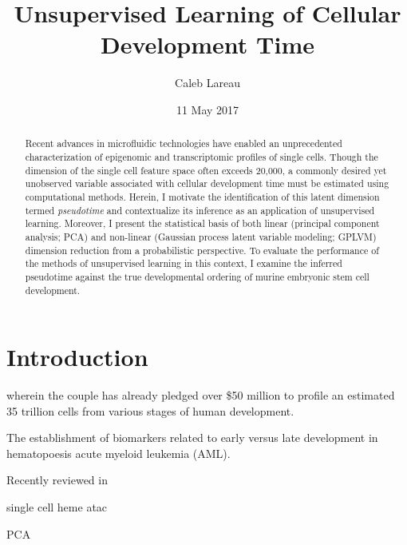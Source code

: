\documentclass[english, 11pt]{article}\usepackage[]{graphicx}\usepackage[]{color}
\begin{document}
\title{Unsupervised Learning of Cellular Development Time}


\author{Caleb Lareau}


\date{11 May 2017}
\maketitle
\begin{abstract}
\noindent Recent advances in microfluidic technologies have enabled an unprecedented characterization of epigenomic and transcriptomic profiles of single cells. Though the dimension of the single cell feature space often exceeds 20,000, a commonly desired yet unobserved variable associated with cellular development time must be estimated using computational methods. Herein, I motivate the identification of this latent dimension termed \textit{pseudotime} and contextualize its inference as an application of unsupervised learning. Moreover, I present the statistical basis of both linear (principal component analysis; PCA) and non-linear (Gaussian process latent variable modeling; GPLVM) dimension reduction from a probabilistic perspective. To evaluate the performance of the methods of unsupervised learning in this context, I examine the inferred pseudotime against the true developmental ordering of murine embryonic stem cell development. 

\newpage{}
\end{abstract}





\section{Introduction}
wherein the couple has already pledged over \$50 million to profile an estimated 35 trillion cells from various stages of human development. \cite{HCA}

The establishment of biomarkers related to early versus late development in hematopoesis acute myeloid leukemia (AML). \cite{corces2016lineage} 

Recently reviewed in \cite{cannoodt2016computational}

single cell heme atac \cite{buenrostro2017single}

PCA \cite{jolliffe2002principal}
\end{document}
